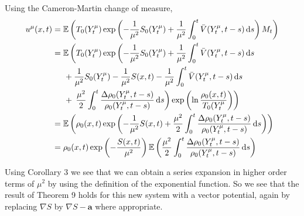 \documentclass[a4paper,12pt,draft]{report}
\begin{document}
{$$$$
Using the Cameron-Martin change of measure,
\begin{align}
u^\mu(x, t) & = \mathbb{E}\left(T_0(Y_t^\mu)\exp\left(-\frac{1}{\mu^2}S_0(Y_t^\mu) + \frac{1}{\mu^2}\int_0^t\bar{V}(Y_t^\mu, t - s)\,\mathrm{d}s\right)M_t\right)\nonumber\\
& = \mathbb{E}\left(T_0(Y_t^\mu)\exp\left(-\frac{1}{\mu^2}S_0(Y_t^\mu) + \frac{1}{\mu^2}\int_0^t\bar{V}(Y_t^\mu, t - s)\,\mathrm{d}s\right.\right.\nonumber\\
& \hspace{0.5cm} + \frac{1}{\mu^2}S_0(Y_t^\mu) - \frac{1}{\mu^2}S(x, t) - \frac{1}{\mu^2}\int_0^t\bar{V}(Y_t^\mu, t - s)\,\mathrm{d}s\nonumber\\
& \hspace{0.5cm} + \left.\left.\frac{\mu^2}{2}\int_0^t\frac{\Delta\rho_0(Y_t^\mu, t - s)}{\rho_0(Y_t^\mu, t - s)}\,\mathrm{d}s\right)\exp\left(\ln\frac{\rho_0(x, t)}{T_0(Y_t^\mu}\right)\right)\nonumber\\
& = \mathbb{E}\left(\rho_0(x, t)\exp\left(-\frac{1}{\mu^2}S(x, t) + \frac{\mu^2}{2}\int_0^t\frac{\Delta\rho_0(Y_t^\mu, t - s)}{\rho_0(Y_t^\mu, t - s)}\,\mathrm{d}s\right)\right)\nonumber\\
& = \rho_0(x, t)\exp\left(-\frac{S(x, t)}{\mu^2}\right)\mathbb{E}\left(\frac{\mu^2}{2}\int_0^t\frac{\Delta\rho_0(Y_t^\mu, t - s)}{\rho_0(Y_t^\mu, t - s)}\,\mathrm{d}s\right)\nonumber
\end{align}

\qedhere
}

Using Corollary 3 we see that we can obtain a series expansion in higher order terms of $\mu^2$ by using the definition of the exponential function.  So we see that the result of Theorem 9 holds for this new system with a vector potential, again by replacing $\nabla S$ by $\nabla S - \mathbf{a}$ where appropriate.
\end{document}
